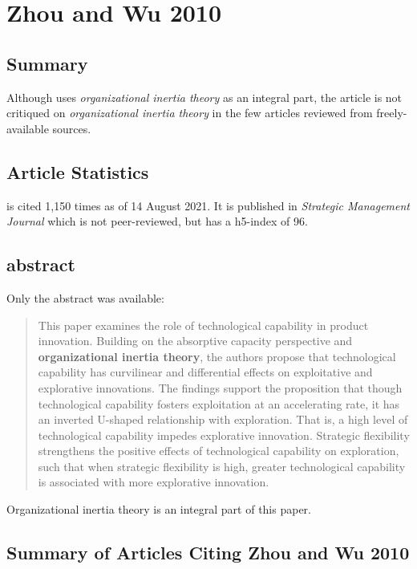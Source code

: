 \section{Zhou and Wu 2010}

\subsection{Summary}

Although \cite{zhou2010technological} uses \textit{organizational inertia theory} as an integral part, the article is not critiqued on \textit{organizational inertia theory} in the few articles reviewed from freely-available sources.

\subsection{Article Statistics}

\cite{zhou2010technological} is cited 1,150 times as of 14 August 2021. It is published in \textit{Strategic Management Journal} which is not peer-reviewed, but has a h5-index of 96.

\subsection{abstract}

Only the abstract was available:

\begin{quotation}
	This paper examines the role of technological capability in product innovation. Building on the absorptive capacity perspective and \textbf{organizational inertia theory}, the authors propose that technological capability has curvilinear and differential effects on exploitative and explorative innovations. The findings support the proposition that though technological capability fosters exploitation at an accelerating rate, it has an inverted U-shaped relationship with exploration. That is, a high level of technological capability impedes explorative innovation. Strategic flexibility strengthens the positive effects of technological capability on exploration, such that when strategic flexibility is high, greater technological capability is associated with more explorative innovation.
\end{quotation}

Organizational inertia theory is an integral part of this paper.

\subsection{Summary of Articles Citing Zhou and Wu 2010}

